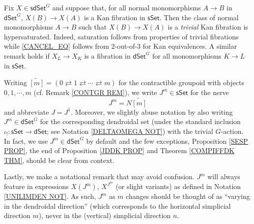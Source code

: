 \documentclass[a4paper,10pt
 ,draft
]{article}%
\begin{document}
\begin{remark}\label{HYPERMODEL REM}
Fix $X \in \mathsf{sdSet}^G$ and suppose that,
for all normal monomorphisms $A\to B$ in $\mathsf{dSet}^G$,
$X(B) \to X(A)$ is a Kan fibration in $\mathsf{sSet}$.
Then the class of normal monomorphisms $A \to B$
such that $X(B) \to X(A)$
is a \emph{trivial} Kan fibration is hypersaturated. 
Indeed, saturation follows from properties of trivial fibrations  while \eqref{CANCEL_EQ} follows from $2$-out-of-$3$ for Kan equivalences.
A similar remark holds if
$X_L \to X_K$ is 
a fibration in $\mathsf{dSet}^G$
for all monomorphisms $K\to L$ in $\mathsf{sSet}$.
\end{remark}







\begin{notation}\label{JM NOT}
Writing
	$\widetilde{[m]} = 
	(0 \rightleftarrows 
	1 \rightleftarrows \cdots
	\rightleftarrows m)$
for the contractible groupoid with objects 
$0,1,\cdots,m$ (cf. Remark \ref{CONTGR REM}),
we write $J^m \in \mathsf{sSet}$ for the nerve
\[
J^m = N \widetilde{[m]}
\]
and abbreviate $J = J^1$.
Moreover, we slightly abuse notation by also writing $J^m \in \mathsf{dSet}^G$ for the corresponding dendroidal set 
(under the standard inclusion $\iota_! \colon \mathsf{sSet} \to \mathsf{dSet}$; see Notation \ref{DELTAOMEGA NOT}) with the trivial $G$-action.
In fact, we use $J^m \in \mathsf{dSet}^G$ by default and the few  exceptions,
Proposition \ref{SESP PROP},
the end of
Proposition \ref{JDDK PROP}
and
Theorem \ref{COMPIFFDK THM},
should be clear from context.

Lastly, we make a notational remark that may avoid confusion. $J^m$ will always feature in expressions $X(J^m)$, $X^{J^m}$ (or slight variants) as defined in Notation \ref{UNILIMDEN NOT}. As such, $J^{m}$ as $m$ changes should be thought of as ``varying in the dendroidal direction'' (which corresponds to the horizontal simplicial direction $m$), never in the (vertical) simplicial direction $n$.
\end{notation}
\end{document}
